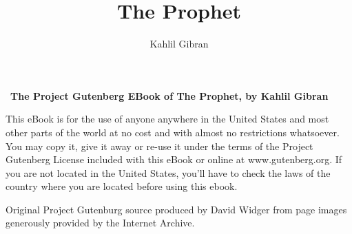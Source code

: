 \documentclass[fontsize=12pt,a5paper,DIV=calc]{scrbook}
\title{The Prophet}
\author{Kahlil Gibran}
\begin{document}
\makeatletter
\begin{titlepage}
	\setlength{\parindent}{0pt}
	\vspace*{.1\textheight}
	{\LARGE \rmfamily \scshape \@author\par}
	\bigbreak
	{\centering \Huge \rmfamily \itshape \@title\par}
\end{titlepage}
\makeatother

{
\thispagestyle{empty}
\,
\vfill
\scriptsize
\sffamily
\noindent
\textbf{The Project Gutenberg EBook of The Prophet, by Kahlil Gibran}\par

\noindent
This eBook is for the use of anyone anywhere in the United States and
most other parts of the world at no cost and with almost no restrictions
whatsoever.  You may copy it, give it away or re-use it under the terms
of the Project Gutenberg License included with this eBook or online at
www.gutenberg.org.  If you are not located in the United States, you'll
have to check the laws of the country where you are located before using
this ebook.

\noindent
Original Project Gutenburg source produced by David Widger from page images generously provided by the Internet Archive.
}


\tableofcontents
\thispagestyle{empty}
\clearpage

\pagestyle{fancy}
\setcounter{page}{1}
{}

\clearpage
\end{document}

